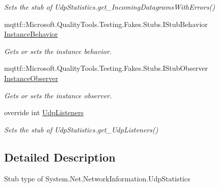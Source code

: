 \begin{DoxyCompactItemize}
\begin{DoxyCompactList}\small\item\em Sets the stub of Udp\-Statistics.\-get\-\_\-\-Incoming\-Datagrams\-With\-Errors()\end{DoxyCompactList}\item 
mqttf\-::\-Microsoft.\-Quality\-Tools.\-Testing.\-Fakes.\-Stubs.\-I\-Stub\-Behavior \hyperlink{class_system_1_1_net_1_1_network_information_1_1_fakes_1_1_stub_udp_statistics_a46c726ef9cdc15ab4cc3534bfcbfa296}{Instance\-Behavior}
\begin{DoxyCompactList}\small\item\em Gets or sets the instance behavior.\end{DoxyCompactList}\item 
mqttf\-::\-Microsoft.\-Quality\-Tools.\-Testing.\-Fakes.\-Stubs.\-I\-Stub\-Observer \hyperlink{class_system_1_1_net_1_1_network_information_1_1_fakes_1_1_stub_udp_statistics_ac655310c2ea2df8396f1a46dfd19f1ab}{Instance\-Observer}
\begin{DoxyCompactList}\small\item\em Gets or sets the instance observer.\end{DoxyCompactList}\item 
override int \hyperlink{class_system_1_1_net_1_1_network_information_1_1_fakes_1_1_stub_udp_statistics_a5ac5bc6907b4702aa85590d65665982a}{Udp\-Listeners}
\begin{DoxyCompactList}\small\item\em Sets the stub of Udp\-Statistics.\-get\-\_\-\-Udp\-Listeners()\end{DoxyCompactList}\end{DoxyCompactItemize}


\subsection{Detailed Description}
Stub type of System.\-Net.\-Network\-Information.\-Udp\-Statistics



